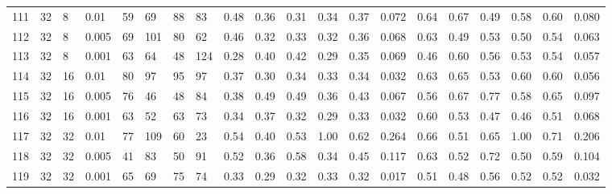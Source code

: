 \begin{landscape}
\begin{longtable}{llllllllllllllllllll}
111 & 32 & 8  & 0.01  & 59  & 69  & 88  & 83  & 0.48 & 0.36 & 0.31 & 0.34 & 0.37 & 0.072 & 0.64 & 0.67 & 0.49 & 0.58 & 0.60 & 0.080 \\
112 & 32 & 8  & 0.005 & 69  & 101 & 80  & 62  & 0.46 & 0.32 & 0.33 & 0.32 & 0.36 & 0.068 & 0.63 & 0.49 & 0.53 & 0.50 & 0.54 & 0.063 \\
113 & 32 & 8  & 0.001 & 63  & 64  & 48  & 124 & 0.28 & 0.40 & 0.42 & 0.29 & 0.35 & 0.069 & 0.46 & 0.60 & 0.56 & 0.53 & 0.54 & 0.057 \\
114 & 32 & 16 & 0.01  & 80  & 97  & 95  & 97  & 0.37 & 0.30 & 0.34 & 0.33 & 0.34 & 0.032 & 0.63 & 0.65 & 0.53 & 0.60 & 0.60 & 0.056 \\
115 & 32 & 16 & 0.005 & 76  & 46  & 48  & 84  & 0.38 & 0.49 & 0.49 & 0.36 & 0.43 & 0.067 & 0.56 & 0.67 & 0.77 & 0.58 & 0.65 & 0.097 \\
116 & 32 & 16 & 0.001 & 63  & 52  & 63  & 73  & 0.34 & 0.37 & 0.32 & 0.29 & 0.33 & 0.032 & 0.60 & 0.53 & 0.47 & 0.46 & 0.51 & 0.068 \\
117 & 32 & 32 & 0.01  & 77  & 109 & 60  & 23  & 0.54 & 0.40 & 0.53 & 1.00 & 0.62 & 0.264 & 0.66 & 0.51 & 0.65 & 1.00 & 0.71 & 0.206 \\
118 & 32 & 32 & 0.005 & 41  & 83  & 50  & 91  & 0.52 & 0.36 & 0.58 & 0.34 & 0.45 & 0.117 & 0.63 & 0.52 & 0.72 & 0.50 & 0.59 & 0.104 \\
119 & 32 & 32 & 0.001 & 65  & 69  & 75  & 74  & 0.33 & 0.29 & 0.32 & 0.33 & 0.32 & 0.017 & 0.51 & 0.48 & 0.56 & 0.52 & 0.52 & 0.032
\end{longtable}
\end{landscape}
